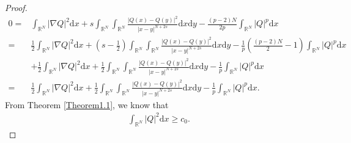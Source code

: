 \documentclass[12pt,a4paper,reqno]{amsart}
\numberwithin{equation}{section}
\begin{document}
\begin{proof}
\begin{equation*}
\begin{aligned}
0=&
\int_{\mathbb{R}^{N}}
|\nabla Q|^{2}
\mathrm{d}x
+s
\int_{\mathbb{R}^{N}}
\int_{\mathbb{R}^{N}}
\frac{|Q(x)-Q(y)|^{2}}{|x-y|^{N+2s}}
\mathrm{d}x
\mathrm{d}y
-\frac{(p-2)N}{2p}
\int_{\mathbb{R}^{N}}
|Q|^{p}
\mathrm{d}x\\
=&\frac{1}{2}
\int_{\mathbb{R}^{N}}
|\nabla Q|^{2}
\mathrm{d}x
+(s-\frac{1}{2})
\int_{\mathbb{R}^{N}}
\int_{\mathbb{R}^{N}}
\frac{|Q(x)-Q(y)|^{2}}{|x-y|^{N+2s}}
\mathrm{d}x
\mathrm{d}y
-\frac{1}{p}
(\frac{(p-2)N}{2}-1)
\int_{\mathbb{R}^{N}}
|Q|^{p}
\mathrm{d}x\\
&+\frac{1}{2}
\int_{\mathbb{R}^{N}}
|\nabla Q|^{2}
\mathrm{d}x
+\frac{1}{2}
\int_{\mathbb{R}^{N}}
\int_{\mathbb{R}^{N}}
\frac{|Q(x)-Q(y)|^{2}}{|x-y|^{N+2s}}
\mathrm{d}x
\mathrm{d}y
-\frac{1}{p}
\int_{\mathbb{R}^{N}}
|Q|^{p}
\mathrm{d}x\\
=&\frac{1}{2}
\int_{\mathbb{R}^{N}}
|\nabla Q|^{2}
\mathrm{d}x
+\frac{1}{2}
\int_{\mathbb{R}^{N}}
\int_{\mathbb{R}^{N}}
\frac{|Q(x)-Q(y)|^{2}}{|x-y|^{N+2s}}
\mathrm{d}x
\mathrm{d}y
-\frac{1}{p}
\int_{\mathbb{R}^{N}}
|Q|^{p}
\mathrm{d}x.
\end{aligned}
\end{equation*}
From Theorem \ref{Theorem1.1},
we know that
\begin{equation*}
\begin{aligned}
\int_{\mathbb{R}^{N}}
|Q|^{2}
\mathrm{d}x\geqslant c_{0}.
\end{aligned}
\end{equation*}
\end{proof}
\end{document}
